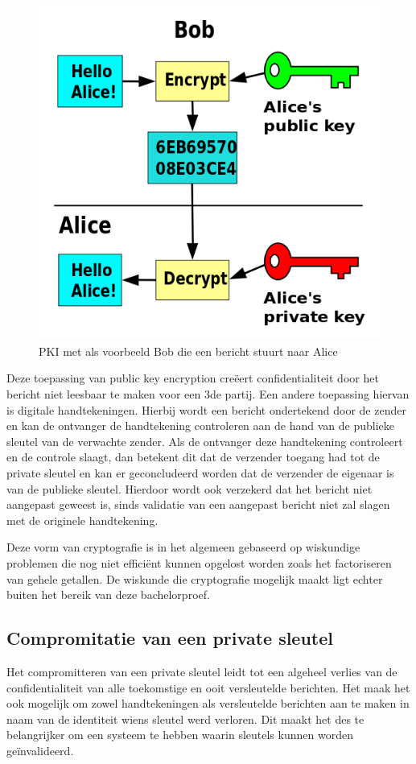 \begin{figure}[H]
	\includegraphics{img/pki-alice-and-bob}
	\centering
	\caption{PKI met als voorbeeld Bob die een bericht stuurt naar Alice}
	\label{fig:pki-alice-and-bob}
\end{figure}

Deze toepassing van public key encryption creëert confidentialiteit door het
bericht niet leesbaar te maken voor een 3de partij. Een andere toepassing
hiervan is digitale handtekeningen. Hierbij wordt een bericht ondertekend door
de zender en kan de ontvanger de handtekening controleren aan de hand van de
publieke sleutel van de verwachte zender. Als de ontvanger deze handtekening
controleert en de controle slaagt, dan betekent dit dat de verzender toegang had
tot de private sleutel en kan er geconcludeerd worden dat de verzender de
eigenaar is van de publieke sleutel. Hierdoor wordt ook verzekerd dat het
bericht niet aangepast geweest is, sinds validatie van een aangepast bericht
niet zal slagen met de originele handtekening.

Deze vorm van cryptografie is in het algemeen gebaseerd op wiskundige problemen
die nog niet efficiënt kunnen opgelost worden zoals het factoriseren van gehele
getallen. De wiskunde die cryptografie mogelijk maakt ligt echter buiten het
bereik van deze bachelorproef.

\subsection{Compromitatie van een private sleutel}
\label{subsec:comprimitatie-van-een-private-sleutel}
Het compromitteren van een private sleutel leidt tot een algeheel verlies van de
confidentialiteit van alle toekomstige en ooit versleutelde berichten. Het maak
het ook mogelijk om zowel handtekeningen als versleutelde berichten aan te maken
in naam van de identiteit wiens sleutel werd verloren. Dit maakt het des te
belangrijker om een systeem te hebben waarin sleutels kunnen worden
geïnvalideerd.


